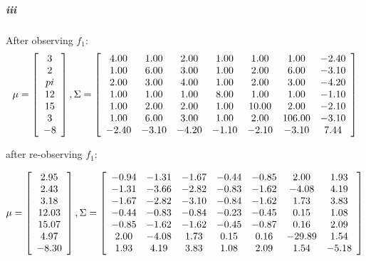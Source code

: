 \documentclass[12pt]{article}
\begin{document}
\subparagraph{iii}
After observing $f_1$: \\
$$\mu = \left[ \begin{array}{c}
3 \\
2 \\
pi \\
12 \\
15 \\
3 \\
-8
\end{array}\right],
\Sigma = \left[ \begin{array}{c c c c c c c}
4.00 & 1.00 & 2.00 & 1.00 & 1.00 & 1.00 & -2.40 \\
1.00 & 6.00 & 3.00 & 1.00 & 2.00 & 6.00 & -3.10 \\
2.00 & 3.00 & 4.00 & 1.00 & 2.00 & 3.00 & -4.20 \\
1.00 & 1.00 & 1.00 & 8.00 & 1.00 & 1.00 & -1.10 \\
1.00 & 2.00 & 2.00 & 1.00 & 10.00 & 2.00 & -2.10 \\
1.00 & 6.00 & 3.00 & 1.00 & 2.00 & 106.00 & -3.10 \\
-2.40 & -3.10 & -4.20 & -1.10 & -2.10 & -3.10 & 7.44
\end{array}\right]$$

after re-observing $f_1$:

$$\mu = \left[ \begin{array}{c}
2.95\\
2.43\\
3.18\\
12.03\\
15.07\\
4.97\\
-8.30\\
\end{array}\right],
\Sigma = \left[ \begin{array}{c c c c c c c}
-0.94 & -1.31 & -1.67 & -0.44 & -0.85 & 2.00 & 1.93 \\
-1.31& -3.66 & -2.82 & -0.83 & -1.62 & -4.08 & 4.19 \\
-1.67 & -2.82 & -3.10 & -0.84 & -1.62 & 1.73 & 3.83 \\
-0.44 & -0.83 & -0.84 & -0.23 & -0.45 & 0.15 & 1.08 \\
-0.85 & -1.62 & -1.62 & -0.45 & -0.87 & 0.16 & 2.09 \\
2.00 & -4.08 & 1.73 & 0.15 & 0.16 & -29.89 & 1.54 \\
1.93 & 4.19 & 3.83 & 1.08 & 2.09 & 1.54 & -5.18\\
\end{array}\right]$$
\end{document}
